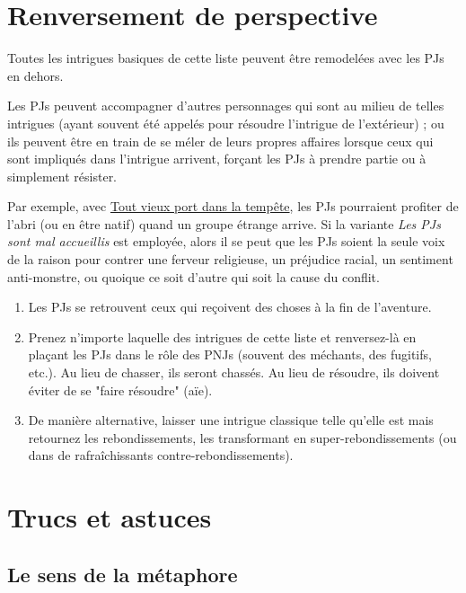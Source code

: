 \begin{multicols}{2}
\section{Renversement de perspective}
\hypertarget{renversement}{}


Toutes les intrigues basiques de cette liste peuvent être remodelées avec les PJs en dehors.

Les PJs peuvent accompagner d'autres personnages qui sont au milieu de telles intrigues (ayant souvent été appelés pour résoudre l'intrigue de l'extérieur) ; ou ils peuvent être en train de se méler de leurs propres affaires lorsque ceux qui sont impliqués dans l'intrigue arrivent, forçant les PJs à prendre partie ou à simplement résister.

Par exemple, avec \hyperlink{port}{Tout vieux port dans la tempête}, les PJs pourraient profiter de l'abri (ou en être natif) quand un groupe étrange arrive. Si la variante \emph{Les PJs sont mal accueillis} est employée, alors il se peut que les PJs soient la seule voix de la raison pour contrer une ferveur religieuse, un préjudice racial, un sentiment anti-monstre, ou quoique ce soit d'autre qui soit la cause du conflit.

\themes
\begin{enumerate}
\item Les PJs se retrouvent ceux qui reçoivent des choses à la fin de l'aventure.
\item Prenez n'importe laquelle des intrigues de cette liste et renversez-là en plaçant les PJs dans le rôle des PNJs (souvent des méchants, des fugitifs, etc.). Au lieu de chasser, ils seront chassés. Au lieu de résoudre, ils doivent éviter de se "faire résoudre" (aïe).
\item De manière alternative, laisser une intrigue classique telle qu'elle est mais retournez les rebondissements, les transformant en super-rebondissements (ou dans de rafraîchissants contre-rebondissements).
\end{enumerate}

\section*{Trucs et astuces}

\subsection*{Le sens de la métaphore}


\end{multicols}
